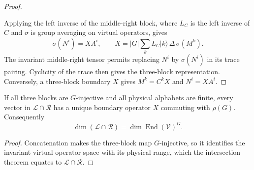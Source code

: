 \begin{proof}
\begin{tenkzequation}
\begin{tenkz}[rows={wire}, cols=4, bonds=none]
        \end{tenkz}
    \end{tenkzequation}
    Applying the left inverse of the middle-right block, where $L_C$ is
    the left inverse of $C$ and $\sigma$ is group averaging on virtual
    operators, gives
    \[
        \sigma(N^i)=XA^i,
        \qquad
        X=|G|\sum_k L_C|k\rangle\,\Delta\,\sigma(M^k).
    \]
    The invariant middle-right tensor permits replacing $N^i$ by
    $\sigma(N^i)$ in its trace pairing. Cyclicity of the trace then
    gives the three-block representation. Conversely, a three-block
    boundary $X$ gives $M^k=C^kX$ and $N^i=XA^i$.
\end{proof}

\begin{corollary}%
    \label{cor:peps_g_injective_strip_boundary}
    \leanok
    If all three blocks are $G$-injective and all physical alphabets
    are finite, every vector in $\mathcal L\cap\mathcal R$ has a unique
    boundary operator $X$ commuting with $\rho(G)$. Consequently
    \[
        \dim(\mathcal L\cap\mathcal R)
        =\dim\operatorname{End}(\mathcal V)^G.
    \]
\end{corollary}

\begin{proof}\leanok
    Concatenation makes the three-block map $G$-injective, so it
    identifies the invariant virtual operator space with its physical
    range, which the intersection theorem equates to $\mathcal L\cap\mathcal R$.
\end{proof}
